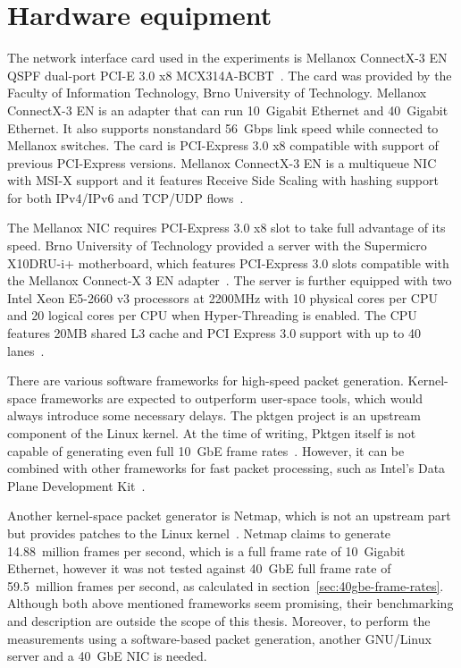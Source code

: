
\section{Hardware equipment}\label{sec:analysis-hardware}
The network interface card used in the experiments is
Mellanox ConnectX-3 EN QSPF dual-port PCI-E 3.0 x8 MCX314A-BCBT~\cite{mellanox-product-brief}.
The card was provided by the Faculty of Information Technology, Brno University of Technology.
Mellanox ConnectX-3 EN is an adapter that can run 10~Gigabit Ethernet and 40~Gigabit Ethernet.
It also supports nonstandard 56~Gbps link speed while connected to Mellanox switches.
The card is PCI-Express 3.0 x8 compatible with support of previous PCI-Express versions.
Mellanox ConnectX-3 EN is a multiqueue NIC with MSI-X support %
and it features Receive Side Scaling with hashing support for both IPv4/IPv6 and TCP/UDP flows~\cite{mellanox-user-manual}.

The Mellanox NIC requires PCI-Express 3.0 x8 slot to take full advantage of its speed.
Brno University of Technology provided a server with
the Supermicro X10DRU-i+ motherboard, which
features PCI-Express 3.0 slots compatible with the Mellanox Connect-X 3 EN adapter~\cite{supermicro-board}.
The server is further equipped with two Intel Xeon E5-2660 v3 processors at 2200MHz with 10 physical cores per CPU
and 20 logical cores per CPU when Hyper-Threading is enabled.
The CPU features 20MB shared L3 cache and PCI Express 3.0 support with up to 40 lanes~\cite{intel-xeon-cpu}.

There are various software frameworks for high-speed packet generation.
Kernel-space frameworks are expected to outperform user-space tools, which would always introduce some necessary delays.
The pktgen project is an upstream component of the Linux kernel.
At the time of writing, Pktgen itself is not capable of generating even full 10~GbE frame rates~\cite{netmap}.
However, it can be combined with other frameworks for fast packet processing, such as
Intel's Data Plane Development Kit~\cite{dpdk}.

Another kernel-space packet generator is Netmap,
which is not an upstream part but provides patches to the Linux kernel~\cite{netmap}.
Netmap claims to generate 14.88~million frames per second, which is a full frame rate of 10~Gigabit Ethernet,
however it was not tested against 40~GbE full frame rate of 59.5~million frames per second,
as calculated in section~\ref{sec:40gbe-frame-rates}.
Although both above mentioned frameworks seem promising, their benchmarking and description
are outside the scope of this thesis.
Moreover, to perform the measurements using a software-based packet generation,
another GNU/Linux server and a 40~GbE NIC is needed.

